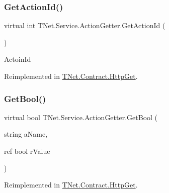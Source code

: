 \mbox{\label{class_t_net_1_1_service_1_1_action_getter_a174e4f8b5f3ca0b236c3984e83276f83}} 
\subsubsection{\texorpdfstring{Get\+Action\+Id()}{GetActionId()}}
{\footnotesize\ttfamily virtual int T\+Net.\+Service.\+Action\+Getter.\+Get\+Action\+Id (\begin{DoxyParamCaption}{ }\end{DoxyParamCaption})\hspace{0.3cm}{\ttfamily [virtual]}}



Actoin\+Id 



Reimplemented in \mbox{\hyperlink{class_t_net_1_1_contract_1_1_http_get_aa0a8d94ffac5ba1d1ccd91b04727410c}{T\+Net.\+Contract.\+Http\+Get}}.

\mbox{\label{class_t_net_1_1_service_1_1_action_getter_aff9d7973b2f74986eeec110c5b2a273f}} 
\subsubsection{\texorpdfstring{Get\+Bool()}{GetBool()}}
{\footnotesize\ttfamily virtual bool T\+Net.\+Service.\+Action\+Getter.\+Get\+Bool (\begin{DoxyParamCaption}\item[{string}]{a\+Name,  }\item[{ref bool}]{r\+Value }\end{DoxyParamCaption})\hspace{0.3cm}{\ttfamily [virtual]}}







Reimplemented in \mbox{\hyperlink{class_t_net_1_1_contract_1_1_http_get_a29c9882dfcb0ba5594dca751ae45efb0}{T\+Net.\+Contract.\+Http\+Get}}.

